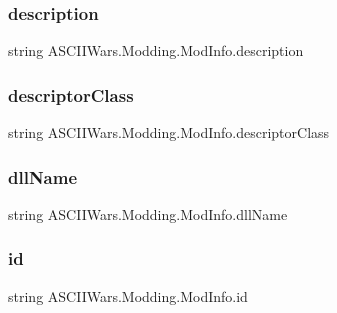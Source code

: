 \subsubsection{\texorpdfstring{description}{description}}
{\footnotesize\ttfamily string A\+S\+C\+I\+I\+Wars.\+Modding.\+Mod\+Info.\+description}

\hypertarget{class_a_s_c_i_i_wars_1_1_modding_1_1_mod_info_a7f39eabbc493e396fdcf224cc02ac12d}{}\label{class_a_s_c_i_i_wars_1_1_modding_1_1_mod_info_a7f39eabbc493e396fdcf224cc02ac12d} 
\subsubsection{\texorpdfstring{descriptor\+Class}{descriptorClass}}
{\footnotesize\ttfamily string A\+S\+C\+I\+I\+Wars.\+Modding.\+Mod\+Info.\+descriptor\+Class}

\hypertarget{class_a_s_c_i_i_wars_1_1_modding_1_1_mod_info_a98c44821a33afbcfddb84e2299d73225}{}\label{class_a_s_c_i_i_wars_1_1_modding_1_1_mod_info_a98c44821a33afbcfddb84e2299d73225} 
\subsubsection{\texorpdfstring{dll\+Name}{dllName}}
{\footnotesize\ttfamily string A\+S\+C\+I\+I\+Wars.\+Modding.\+Mod\+Info.\+dll\+Name}

\hypertarget{class_a_s_c_i_i_wars_1_1_modding_1_1_mod_info_a5ebe9e95930e72b641e0803770b289cd}{}\label{class_a_s_c_i_i_wars_1_1_modding_1_1_mod_info_a5ebe9e95930e72b641e0803770b289cd} 
\subsubsection{\texorpdfstring{id}{id}}
{\footnotesize\ttfamily string A\+S\+C\+I\+I\+Wars.\+Modding.\+Mod\+Info.\+id}

